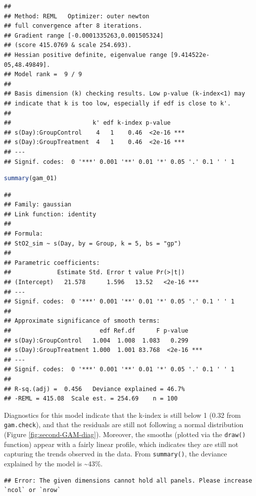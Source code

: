 \documentclass[
]{article}
\newcommand{\passthrough}[1]{#1}
\begin{document}
\begin{lstlisting}
## 
## Method: REML   Optimizer: outer newton
## full convergence after 8 iterations.
## Gradient range [-0.0001335263,0.001505324]
## (score 415.0769 & scale 254.693).
## Hessian positive definite, eigenvalue range [9.414522e-05,48.49849].
## Model rank =  9 / 9 
## 
## Basis dimension (k) checking results. Low p-value (k-index<1) may
## indicate that k is too low, especially if edf is close to k'.
## 
##                       k' edf k-index p-value    
## s(Day):GroupControl    4   1    0.46  <2e-16 ***
## s(Day):GroupTreatment  4   1    0.46  <2e-16 ***
## ---
## Signif. codes:  0 '***' 0.001 '**' 0.01 '*' 0.05 '.' 0.1 ' ' 1
\end{lstlisting}

\begin{lstlisting}[language=R]
summary(gam_01)
\end{lstlisting}

\begin{lstlisting}
## 
## Family: gaussian 
## Link function: identity 
## 
## Formula:
## StO2_sim ~ s(Day, by = Group, k = 5, bs = "gp")
## 
## Parametric coefficients:
##             Estimate Std. Error t value Pr(>|t|)    
## (Intercept)   21.578      1.596   13.52   <2e-16 ***
## ---
## Signif. codes:  0 '***' 0.001 '**' 0.01 '*' 0.05 '.' 0.1 ' ' 1
## 
## Approximate significance of smooth terms:
##                         edf Ref.df      F p-value    
## s(Day):GroupControl   1.004  1.008  1.083   0.299    
## s(Day):GroupTreatment 1.000  1.001 83.768  <2e-16 ***
## ---
## Signif. codes:  0 '***' 0.001 '**' 0.01 '*' 0.05 '.' 0.1 ' ' 1
## 
## R-sq.(adj) =  0.456   Deviance explained = 46.7%
## -REML = 415.08  Scale est. = 254.69    n = 100
\end{lstlisting}

Diagnostics for this model indicate that the k-index is still below 1 (0.32 from \passthrough{\lstinline!gam.check!}), and that the residuals are still not following a normal distribution (Figure \ref{fig:second-GAM-diag}). Moreover, the smooths (plotted via the \passthrough{\lstinline!draw()!} function) appear with a fairly linear profile, which indicates they are still not capturing the trends observed in the data. From \passthrough{\lstinline!summary()!}, the deviance explained by the model is \textasciitilde43\%.



\begin{lstlisting}
## Error: The given dimensions cannot hold all panels. Please increase `ncol` or `nrow`
\end{lstlisting}
\end{document}
